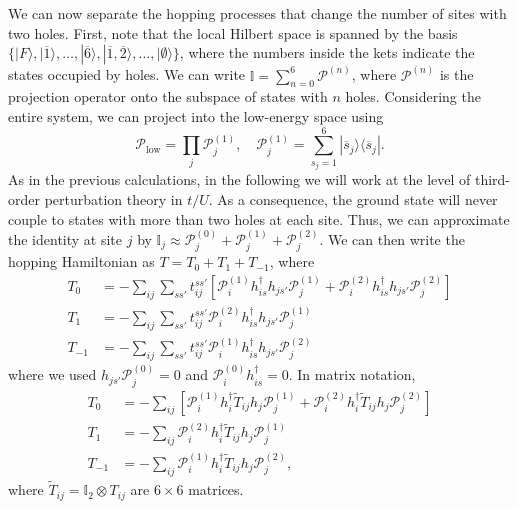 \documentclass[11pt, a4paper]{article}
\begin{document}
We can now separate the hopping processes that change the number of sites with two holes. First, note that the local Hilbert space is spanned by the basis 
$\{|F\rangle, |\overline{1}\rangle, \dots, |\overline{6}\rangle, |\overline{1}, \overline{2}\rangle, \dots, |\emptyset\rangle\}$, 
where the numbers inside the kets indicate the states occupied by holes. We can write $\mathbb{I} = \sum_{n=0}^6 \mathcal{P}^{(n)}$, where $\mathcal{P}^{(n)}$ is the projection operator onto the subspace of states with $n$ holes. Considering the entire system, we can project into the low-energy space using
\begin{equation}
\mathcal{P}_{\text{low}} = \prod_j \mathcal{P}_j^{(1)}, \quad \mathcal{P}_j^{(1)} = \sum_{s_j=1}^6 |\overline{s}_j\rangle \langle \overline{s}_j|.
\end{equation}
As in the previous calculations, in the following we will work at the level of third-order perturbation theory in $t/U$. As a consequence, the ground state will never couple to states with more than two holes at each site. Thus, we can approximate the identity at site $j$ by $\mathbb{I}_j \approx \mathcal{P}_j^{(0)} + \mathcal{P}_j^{(1)} + \mathcal{P}_j^{(2)}$. We can then write the hopping Hamiltonian as $T = T_0 + T_1 + T_{-1}$, where
\begin{align}
T_0 &= -\sum_{ij} \sum_{ss'} t_{ij}^{ss'} \left[ \mathcal{P}_i^{(1)} h_{is}^{\dagger} h_{js'} \mathcal{P}_j^{(1)} + \mathcal{P}_i^{(2)} h_{is}^{\dagger} h_{js'} \mathcal{P}_j^{(2)} \right] \\
T_1 &= -\sum_{ij} \sum_{ss'} t_{ij}^{ss'} \mathcal{P}_i^{(2)} h_{is}^{\dagger} h_{js'} \mathcal{P}_j^{(1)} \\
T_{-1} &= -\sum_{ij} \sum_{ss'} t_{ij}^{ss'} \mathcal{P}_i^{(1)} h_{is}^{\dagger} h_{js'} \mathcal{P}_j^{(2)}
\end{align}
where we used $h_{js'} \mathcal{P}_j^{(0)} = 0$ and $\mathcal{P}_i^{(0)} h_{is}^{\dagger} = 0$. In matrix notation,
\begin{align}
T_0 &= -\sum_{ij} \left[ \mathcal{P}_i^{(1)} h_i^{\dagger} \tilde{T}_{ij} h_j \mathcal{P}_j^{(1)} + \mathcal{P}_i^{(2)} h_i^{\dagger} \tilde{T}_{ij} h_j \mathcal{P}_j^{(2)} \right] \\
T_1 &= -\sum_{ij} \mathcal{P}_i^{(2)} h_i^{\dagger} \tilde{T}_{ij} h_j \mathcal{P}_j^{(1)} \\
T_{-1} &= -\sum_{ij} \mathcal{P}_i^{(1)} h_i^{\dagger} \tilde{T}_{ij} h_j \mathcal{P}_j^{(2)},
\end{align}
where $\tilde{T}_{ij} = \mathbb{I}_2 \otimes T_{ij}$ are $6 \times 6$ matrices.
\end{document}
